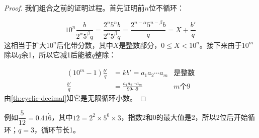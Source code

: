 \documentclass[b5paper]{ctexart}
\begin{document}
\begin{proof}
我们组合之前的证明过程。首先证明前$n$位不循环：

\[
10^n \frac{b}{2^{\alpha} 5^{\beta} q} = \frac{2^n 5^n b}{2^{\alpha} 5^{\beta} q} = \frac{2^{n - \alpha} 5^{n - \beta} b}{q} = X + \frac{b'}{q}
\]
这相当于扩大$10^n$后化带分数，其中$X$是整数部分，$0 \leq X < 10^n$。接下来由于$10^{m}$除以$q$余1，所以它减1后能被$q$整除：

\begin{align*}
  (10^{m} - 1) \frac{b'}{q} &= k b' = a_1 a_2 \cdots a_m & \text{是整数}\\
                \frac{b'}{q} &= \frac{a_1 a_2 \cdots a_m}{99\cdots9} & m\text{个}9
\end{align*}
由\cref{th:cyclic-decimal}知它是无限循环小数。
\end{proof}

例如$\dfrac{5}{12} = 0.41\dot{6}$，其中$12 = 2^2 \times 5^0 \times 3$，指数2和0的最大值是2，所以2位后开始循环；$q = 3$，循环节长1。
\end{document}
